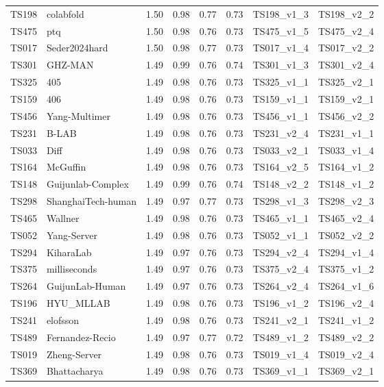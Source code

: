 \begin{table}[ht]
{\begin{tabular}{llllllll}
TS198 & colabfold & 1.50 & 0.98 & 0.77 & 0.73 & TS198\_v1\_3 & TS198\_v2\_2 \\ 
TS475 & ptq & 1.50 & 0.98 & 0.76 & 0.73 & TS475\_v1\_5 & TS475\_v2\_4 \\ 
TS017 & Seder2024hard & 1.50 & 0.98 & 0.77 & 0.73 & TS017\_v1\_4 & TS017\_v2\_2 \\ 
TS301 & GHZ-MAN & 1.49 & 0.99 & 0.76 & 0.74 & TS301\_v1\_3 & TS301\_v2\_4 \\ 
TS325 & 405 & 1.49 & 0.98 & 0.76 & 0.73 & TS325\_v1\_1 & TS325\_v2\_1 \\ 
TS159 & 406 & 1.49 & 0.98 & 0.76 & 0.73 & TS159\_v1\_1 & TS159\_v2\_1 \\ 
TS456 & Yang-Multimer & 1.49 & 0.98 & 0.76 & 0.73 & TS456\_v1\_1 & TS456\_v2\_2 \\ 
TS231 & B-LAB & 1.49 & 0.98 & 0.76 & 0.73 & TS231\_v2\_4 & TS231\_v1\_1 \\ 
TS033 & Diff & 1.49 & 0.98 & 0.76 & 0.73 & TS033\_v2\_1 & TS033\_v1\_4 \\ 
TS164 & McGuffin & 1.49 & 0.98 & 0.76 & 0.73 & TS164\_v2\_5 & TS164\_v1\_2 \\ 
TS148 & Guijunlab-Complex & 1.49 & 0.99 & 0.76 & 0.74 & TS148\_v2\_2 & TS148\_v1\_2 \\ 
TS298 & ShanghaiTech-human & 1.49 & 0.97 & 0.77 & 0.73 & TS298\_v1\_3 & TS298\_v2\_3 \\ 
TS465 & Wallner & 1.49 & 0.98 & 0.76 & 0.73 & TS465\_v1\_1 & TS465\_v2\_4 \\ 
TS052 & Yang-Server & 1.49 & 0.98 & 0.76 & 0.73 & TS052\_v1\_1 & TS052\_v2\_2 \\ 
TS294 & KiharaLab & 1.49 & 0.97 & 0.76 & 0.73 & TS294\_v2\_4 & TS294\_v1\_4 \\ 
TS375 & milliseconds & 1.49 & 0.97 & 0.76 & 0.73 & TS375\_v2\_4 & TS375\_v1\_2 \\ 
TS264 & GuijunLab-Human & 1.49 & 0.97 & 0.76 & 0.73 & TS264\_v2\_4 & TS264\_v1\_6 \\ 
TS196 & HYU\_MLLAB & 1.49 & 0.98 & 0.76 & 0.73 & TS196\_v1\_2 & TS196\_v2\_4 \\ 
TS241 & elofsson & 1.49 & 0.98 & 0.76 & 0.73 & TS241\_v2\_1 & TS241\_v1\_2 \\ 
TS489 & Fernandez-Recio & 1.49 & 0.97 & 0.77 & 0.72 & TS489\_v1\_2 & TS489\_v2\_2 \\ 
TS019 & Zheng-Server & 1.49 & 0.98 & 0.76 & 0.73 & TS019\_v1\_4 & TS019\_v2\_4 \\ 
TS369 & Bhattacharya & 1.49 & 0.98 & 0.76 & 0.73 & TS369\_v1\_1 & TS369\_v2\_1 \\ 

\end{tabular}}
\end{table}
